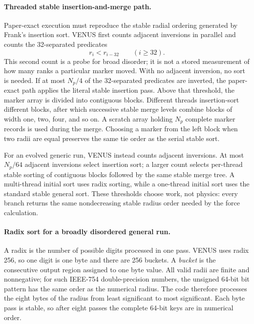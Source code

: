 \paragraph{Threaded stable insertion-and-merge path.}
Paper-exact execution must reproduce the stable radial ordering generated by
Frank's insertion sort.  VENUS first counts adjacent inversions in parallel
and counts the 32-separated predicates
\[
 r_i<r_{i-32}\qquad (i\ge32).
\]
This second count is a probe for broad disorder; it is not a stored
measurement of how many ranks a particular marker moved.  With no adjacent
inversion, no sort is needed.  If at most \(N_p/4\) of the 32-separated
predicates are inverted, the paper-exact path applies the literal stable
insertion pass.  Above that threshold, the marker array is divided into
contiguous blocks.  Different threads insertion-sort different blocks, after
which successive stable merge levels combine blocks of width one, two, four,
and so on.  A scratch array holding \(N_p\) complete marker records is used
during the merge.  Choosing a marker from the left block when two radii are
equal preserves the same tie order as the serial stable sort.

For an evolved generic run, VENUS instead counts adjacent inversions.  At
most \(N_p/64\) adjacent inversions select insertion sort; a larger count
selects per-thread stable sorting of contiguous blocks followed by the same
stable merge tree.  A multi-thread initial sort uses radix sorting, while a
one-thread initial sort uses the standard stable general sort.  These
thresholds choose work, not physics: every branch returns the same
nondecreasing stable radius order needed by the force calculation.

\paragraph{Radix sort for a broadly disordered general run.}
A radix is the number of possible digits processed in one pass.  VENUS uses
radix 256, so one digit is one byte and there are 256 buckets.  A
\emph{bucket} is the consecutive output region assigned to one byte value.
All valid radii are finite and nonnegative; for such IEEE-754 double-precision
numbers, the unsigned 64-bit bit pattern has the same order as the numerical
radius.  The code therefore processes the eight bytes of the radius from
least significant to most significant.  Each byte pass is stable, so after
eight passes the complete 64-bit keys are in numerical order.

